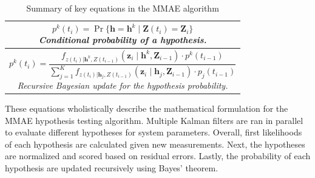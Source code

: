 \documentclass[letterpaper, 10 pt, conference]{ieeeconf}  %
\begin{document}
\begin{table}[h]
\begin{tabular}{|c|}
        \begin{minipage}{0.95\linewidth}
            \begin{equation} 
                p^k (t_i) = \Pr\{\mathbf{h} = \mathbf{h}^k \mid \mathbf{Z}(t_i) = \mathbf{Z}_i\} 
                \tag{17}
            \end{equation}
            \centering \textit{Conditional probability of a hypothesis.}
        \end{minipage} \\
        \hline
        \begin{minipage}{0.95\linewidth}
            \begin{equation} 
                p^k (t_i) = \frac{ f_{z(t_i) | \mathbf{h}^k, Z(t_{i-1})} (\mathbf{z}_i \mid \mathbf{h}^k, \mathbf{Z}_{i-1}) \cdot p^k (t_{i-1}) }
                {\sum\limits_{j=1}^{K} f_{z(t_i) | \mathbf{h}_j, Z(t_{i-1})} (\mathbf{z}_i \mid \mathbf{h}_j, \mathbf{Z}_{i-1}) \cdot p_j (t_{i-1}) } 
                \tag{18}
            \end{equation}
            \centering \textit{Recursive Bayesian update for the hypothesis probability.}
        \end{minipage} \\
        \hline
    \end{tabular}
    \caption{Summary of key equations in the MMAE algorithm}
    \label{tab:equations_summary}
\end{table}

These equations wholistically describe the mathematical formulation for the MMAE hypothesis testing algorithm. Multiple Kalman filters are ran in parallel to evaluate different hypotheses for system parameters. Overall, first likelihoods of each hypothesis are calculated given new measurements. Next, the hypotheses are normalized and scored based on residual errors. Lastly, the probability of each hypothesis are updated recursively using Bayes’ theorem.
\end{document}
